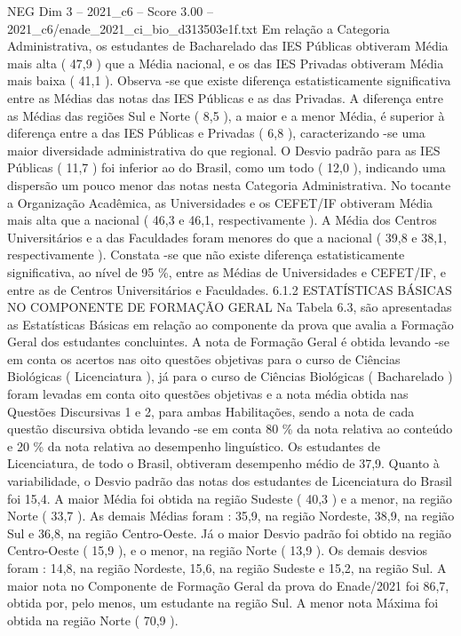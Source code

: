 \begin{textsample}{NEG Dim 3 – 2021\_c6 – Score 3.00 – 2021\_c6/enade\_2021\_ci\_bio\_d313503e1f.txt}
Em relação a Categoria Administrativa, os estudantes de Bacharelado das IES Públicas obtiveram Média mais alta ( 47,9 ) que a Média nacional, e os das IES Privadas obtiveram Média mais baixa ( 41,1 ).
Observa -se que existe diferença estatisticamente significativa entre as Médias das notas das IES Públicas e as das Privadas.
A diferença entre as Médias das regiões Sul e Norte ( 8,5 ), a maior e a menor Média, é superior à diferença entre a das IES Públicas e Privadas ( 6,8 ), caracterizando -se uma maior diversidade administrativa do que regional.
O Desvio padrão para as IES Públicas ( 11,7 ) foi inferior ao do Brasil, como um todo ( 12,0 ), indicando uma dispersão um pouco menor das notas nesta Categoria Administrativa.
No tocante a Organização Acadêmica, as Universidades e os CEFET/IF obtiveram Média mais alta que a nacional ( 46,3 e 46,1, respectivamente ).
A Média dos Centros Universitários e a das Faculdades foram menores do que a nacional ( 39,8 e 38,1, respectivamente ).
Constata -se que não existe diferença estatisticamente significativa, ao nível de 95 \%, entre as Médias de Universidades e CEFET/IF, e entre as de Centros Universitários e Faculdades. 6.1.2 ESTATÍSTICAS BÁSICAS NO COMPONENTE DE FORMAÇÃO GERAL Na Tabela 6.3, são apresentadas as Estatísticas Básicas em relação ao componente da prova que avalia a Formação Geral dos estudantes concluintes.
A nota de Formação Geral é obtida levando -se em conta os acertos nas oito questões objetivas para o curso de Ciências Biológicas ( Licenciatura ), já para o curso de Ciências Biológicas ( Bacharelado ) foram levadas em conta oito questões objetivas e a nota média obtida nas Questões Discursivas 1 e 2, para ambas Habilitações, sendo a nota de cada questão discursiva obtida levando -se em conta 80 \% da nota relativa ao conteúdo e 20 \% da nota relativa ao desempenho linguístico.
Os estudantes de Licenciatura, de todo o Brasil, obtiveram desempenho médio de 37,9.
Quanto à variabilidade, o Desvio padrão das notas dos estudantes de Licenciatura do Brasil foi 15,4.
A maior Média foi obtida na região Sudeste ( 40,3 ) e a menor, na região Norte ( 33,7 ).
As demais Médias foram : 35,9, na região Nordeste, 38,9, na região Sul e 36,8, na região Centro-Oeste.
Já o maior Desvio padrão foi obtido na região Centro-Oeste ( 15,9 ), e o menor, na região Norte ( 13,9 ).
Os demais desvios foram : 14,8, na região Nordeste, 15,6, na região Sudeste e 15,2, na região Sul.
A maior nota no Componente de Formação Geral da prova do Enade/2021 foi 86,7, obtida por, pelo menos, um estudante na região Sul.
A menor nota Máxima foi obtida na região Norte ( 70,9 ).

\end{textsample}
